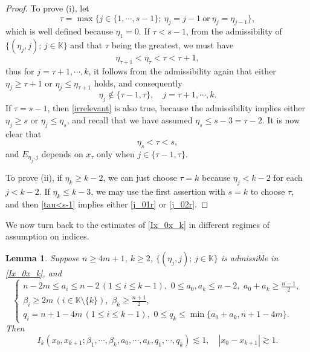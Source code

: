 \documentclass[11pt,reqno]{amsart}
\newtheorem{lemma}[theorem]{Lemma}
\numberwithin{equation}{section}
\theoremstyle{definition}
\begin{document}
\begin{proof}
	To prove (i), let
	\begin{equation}\label{maxtau}
		\tau=\max\{j\in\{1,\cdots,s-1\};~\eta_j=j-1~\text{or}~\eta_j=\eta_{j-1}\},
	\end{equation}
	which is well defined because $\eta_1=0$. If $\tau<s-1$, from the admissibility of $\{(\eta_j,j);\,j\in\mathbb{K}\}$ and that $\tau$ being the greatest, we must have
	\begin{equation}\label{tau<s-1}
		\eta_{\tau+1}<\eta_\tau<\tau<\tau+1,
	\end{equation}
	thus for $j=\tau+1,\cdots,k$, it follows from the admissibility again that either $\eta_j\geq\tau+1$ or $\eta_j\leq\eta_{\tau+1}$ holds, and consequently
	\begin{equation}\label{irrelevant}
		\eta_j\notin\{\tau-1,\tau\},\quad j=\tau+1,\cdots,k.
	\end{equation}
	If $\tau=s-1$, then \eqref{irrelevant} is also true, because the admissibility implies either $\eta_j\geq s$ or $\eta_j\leq\eta_s$, and recall that we have assumed $\eta_s\leq s-3=\tau-2$. It is now clear that
	\begin{equation}\label{2leqtauleqk-1}
		\eta_s<\tau< s,
	\end{equation}
	and $E_{\eta_j,j}$ depends on $x_\tau$ only when $j\in\{\tau-1,\tau\}$.	
	
	To prove (ii), if $\eta_k\geq k-2$, we can just choose $\tau=k$ because $\eta_j< k-2$ for each $j<k-2$. If $\eta_k\leq k-3$, we may use the first assertion with $s=k$ to choose $\tau$, and then \eqref{tau<s-1} implies either \eqref{j_01r} or \eqref{j_02r}.
\end{proof}

We now turn back to the estimates of \eqref{Ix_0x_k} in different regimes of assumption on indices.


\begin{lemma}\label{propIkest1}
	Suppose $n\geq4m+1$, $k\geq2$, $\{(\eta_j,j);\,j\in\mathbb{K}\}$ is admissible in \eqref{Ix_0x_k}, and
	\begin{equation}\label{indexcond1}
		\begin{cases}
			n-2m\leq a_i\leq n-2\,(1\leq i\leq k-1),\,\,0\leq a_0,a_k\leq n-2,\,\,a_0+a_k\geq\mbox{$\frac{n-1}{2}$},\\
			\beta_i\geq2m\,(i\in\mathbb{K}\setminus\{k\}),\,\,\beta_k\geq\mbox{$\frac{n+1}{2}$},\\
			q_i=n+1-4m\,(1\leq i\leq k-1),\,\,0\leq q_k\leq\min\{a_0+a_k,n+1-4m\}.
		\end{cases}
	\end{equation}
	Then
	\begin{equation*}
		I_k(x_0,x_{k+1};\beta_1,\cdots,\beta_k,a_0,\cdots,a_k,q_1,\cdots,q_k)\lesssim1,\quad|x_0-x_{k+1}|\gtrsim1.
	\end{equation*}
\end{lemma}
\end{document}
